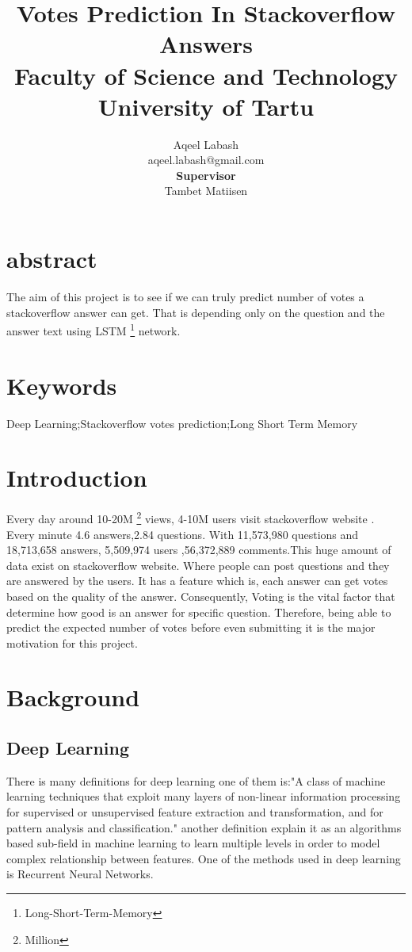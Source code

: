 \documentclass{article}
\begin{document}
\title{Votes Prediction In Stackoverflow Answers\\
Faculty of Science and Technology\\University of Tartu}
\author{
Aqeel Labash\\aqeel.labash@gmail.com\\ \textbf{Supervisor}\\
       Tambet Matiisen}
\maketitle
\setlength\columnsep{15pt} 
\begin{multicols*}{2}
\begin{flushleft}
\section*{abstract}
The aim of this project is to see if we can truly predict number of votes a stackoverflow answer can get. That is depending only on the question and the answer text using LSTM \footnote{Long-Short-Term-Memory} network.
\section*{Keywords}
Deep Learning;Stackoverflow votes prediction;Long Short Term Memory
\section{Introduction}
Every day around 10-20M \footnote{Million} views, 4-10M users visit stackoverflow website \cite{1}. Every minute 4.6 answers,2.84 questions. With 11,573,980 questions and 18,713,658 answers, 5,509,974 users ,56,372,889 comments.\cite{2}This huge amount of data exist on stackoverflow website. Where people can post questions and they are answered by the users. It has a feature which is, each answer can get votes based on the quality of the answer. Consequently, Voting is the vital factor that determine how good is an answer for specific question. Therefore, being able to predict the expected number of votes before even submitting it is the major motivation for this project.
\section{Background}
\subsection{Deep Learning}
There is many definitions for deep learning one of them is:"A class  of machine learning techniques that exploit many layers of non-linear information processing for supervised or unsupervised feature extraction and transformation, and for pattern analysis and classification."\cite{3} another definition explain it as an algorithms based sub-field in machine learning to learn multiple levels in order to model complex relationship between features.\cite{3} One of the methods used in deep learning is Recurrent Neural Networks.

\end{flushleft}
\end{multicols*}
\end{document}

